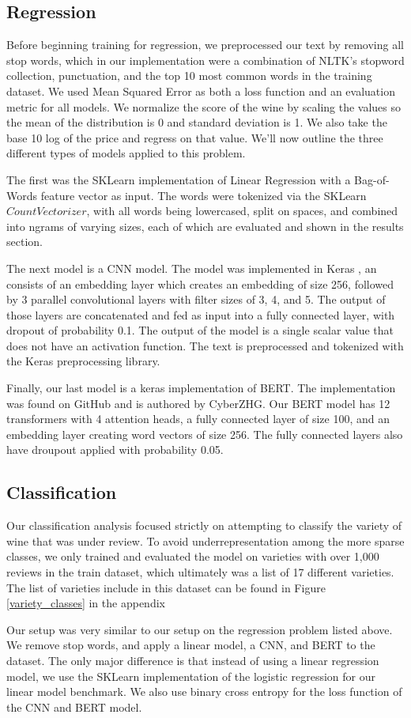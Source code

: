 \documentclass[12pt]{IEEEtran}
\begin{document}
\subsection{Regression}
    Before beginning training for regression, we preprocessed our text by removing all stop words, which in our implementation were a combination of NLTK's stopword collection, punctuation, and the top 10 most common words in the training dataset. We used Mean Squared Error as both a loss function and an evaluation metric for all models. We normalize the score of the wine by scaling the values so the mean of the distribution is 0 and standard deviation is 1. We also take the base 10 log of the price and regress on that value. We'll now outline the three different types of models applied to this problem.\par
    The first was the SKLearn implementation of Linear Regression with a Bag-of-Words feature vector as input. The words were tokenized via the SKLearn $CountVectorizer$, with all words being lowercased, split on spaces, and combined into ngrams of varying sizes, each of which are evaluated and shown in the results section. \par
    The next model is a CNN model. The model was implemented in Keras \cite{keras}, an consists of an embedding layer which creates an embedding of size 256, followed by 3 parallel convolutional layers with filter sizes of 3, 4, and 5. The output of those layers are concatenated and fed as input into a fully connected layer, with dropout of probability 0.1. The output of the model is a single scalar value that does not have an activation function. The text is preprocessed and tokenized with the Keras preprocessing library. \par
    Finally, our last model is a keras implementation of BERT. The implementation was found on GitHub and is authored by CyberZHG\cite{keras_bert}. Our BERT model has 12 transformers with 4 attention heads, a fully connected layer of size 100, and an embedding layer creating word vectors of size 256. The fully connected layers also have droupout applied with probability 0.05.

\subsection{Classification}
    Our classification analysis focused strictly on attempting to classify the variety of wine that was under review. To avoid underrepresentation among the more sparse classes, we only trained and evaluated the model on varieties with over 1,000 reviews in the train dataset, which ultimately was a list of 17 different varieties. The list of varieties include in this dataset can be found in Figure \ref{variety_classes} in the appendix \par
    Our setup was very similar to our setup on the regression problem listed above. We remove stop words, and apply a linear model, a CNN, and BERT to the dataset. The only major difference is that instead of using a linear regression model, we use the SKLearn implementation of the logistic regression for our linear model benchmark\cite{sklearn}. We also use binary cross entropy for the loss function of the CNN and BERT model.
\end{document}
